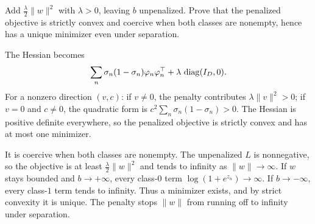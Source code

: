 \begin{hwqbox}
Add $\tfrac\lambda2\lVert w\rVert^2$ with $\lambda>0$, leaving $b$ unpenalized. Prove that the penalized objective is strictly convex and coercive when both classes are nonempty, hence has a unique minimizer even under separation.
\end{hwqbox}
\begin{hwsolbox}
The Hessian becomes
\[
\sum_n\sigma_n(1-\sigma_n)\varphi_n\varphi_n^\top+\lambda\,\operatorname{diag}(I_D,0).
\]
For a nonzero direction $(v,c)$: if $v\ne 0$, the penalty contributes $\lambda\lVert v\rVert^2>0$; if $v=0$ and $c\ne 0$, the quadratic form is $c^2\sum_n\sigma_n(1-\sigma_n)>0$. The Hessian is positive definite everywhere, so the penalized objective is strictly convex and has at most one minimizer.

It is coercive when both classes are nonempty. The unpenalized $L$ is nonnegative, so the objective is at least $\tfrac\lambda2\lVert w\rVert^2$ and tends to infinity as $\lVert w\rVert\to\infty$. If $w$ stays bounded and $b\to+\infty$, every class-$0$ term $\log(1+e^{z_n})\to\infty$. If $b\to-\infty$, every class-$1$ term tends to infinity. Thus a minimizer exists, and by strict convexity it is unique. The penalty stops $\lVert w\rVert$ from running off to infinity under separation.
\end{hwsolbox}
